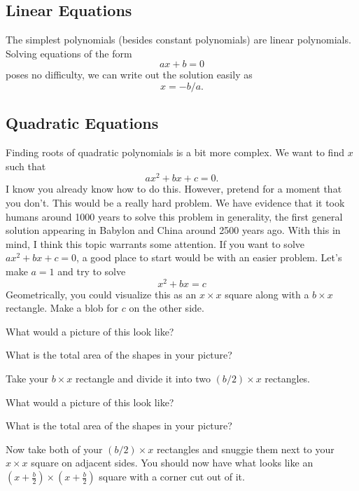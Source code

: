 \subsection{Linear Equations}

The simplest polynomials (besides constant polynomials) are linear
polynomials. Solving equations of the form
\[
ax + b = 0
\]
poses no difficulty, we can write out the solution easily as
\[
x = -b/a.
\]



\subsection{Quadratic Equations}

Finding roots of quadratic polynomials is a bit more complex. We want
to find $x$ such that
\[
ax^2 + bx + c = 0.
\]
I know you already know how to do this. However, pretend for a moment
that you don't. This would be a really hard problem. We have evidence
that it took humans around 1000 years to solve this problem in
generality, the first general solution appearing in Babylon and China
around 2500 years ago. With this in mind, I think this topic warrants
some attention. If you want to solve $ax^2 + bx + c = 0$, a good place
to start would be with an easier problem. Let's make $a=1$ and try to
solve
\[
x^2 + b x = c
\]
Geometrically, you could visualize this as an $x \times x$ square
along with a $b\times x$ rectangle. Make a blob for $c$ on the other side. 

\begin{question} What would a picture of this look like?
\end{question}
\QM

\begin{question} What is the total area of the shapes in your picture?
\end{question}
\QM

Take your $b\times x$ rectangle and divide it into two
$(b/2)\times x$ rectangles.

\begin{question} What would a picture of this look like?
\end{question}
\QM

\begin{question} What is the total area of the shapes in your picture?
\end{question}
\QM

Now take both of your $(b/2)\times x$ rectangles and snuggie them
next to your $x\times x$ square on adjacent sides. You should now have
what looks like an $(x + \frac{b}{2}) \times (x +
\frac{b}{2})$ square with a corner cut out of it.

